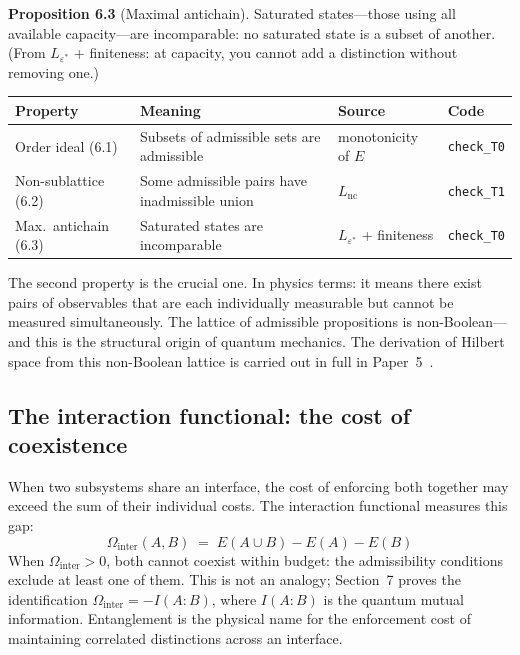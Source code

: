\documentclass[11pt]{article}
\begin{document}
\textbf{Proposition 6.3} (Maximal antichain).  Saturated states---those using all available capacity---are incomparable: no saturated state is a subset of another.  (From $L_{\varepsilon^*}$ + finiteness: at capacity, you cannot add a distinction without removing one.)

\smallskip
\begin{center}
\small
\begin{tabular}{lp{4.2cm}ll}
\toprule
\textbf{Property} & \textbf{Meaning} & \textbf{Source} & \textbf{Code} \\
\midrule
Order ideal (6.1) & Subsets of admissible sets are admissible & monotonicity of $E$ & \texttt{check\_T0} \\
Non-sublattice (6.2) & Some admissible pairs have inadmissible union & $L_{\mathrm{nc}}$ & \texttt{check\_T1} \\
Max.\ antichain (6.3) & Saturated states are incomparable & $L_{\varepsilon^*}$ + finiteness & \texttt{check\_T0} \\
\bottomrule
\end{tabular}
\end{center}
\smallskip

The second property is the crucial one.  In physics terms: it means there exist pairs of observables that are each individually measurable but cannot be measured simultaneously.  The lattice of admissible propositions is non-Boolean---and this is the structural origin of quantum mechanics.  The derivation of Hilbert space from this non-Boolean lattice is carried out in full in Paper~5~\cite{P5}.


\subsection{The interaction functional: the cost of coexistence}

When two subsystems share an interface, the cost of enforcing both together may exceed the sum of their individual costs.  The interaction functional measures this gap:
\begin{equation}
\Omega_{\mathrm{inter}}(A,B) \;=\; E(A \cup B) - E(A) - E(B)
\end{equation}
When $\Omega_{\mathrm{inter}} > 0$, both cannot coexist within budget: the admissibility conditions exclude at least one of them.  This is not an analogy; Section~7 proves the identification $\Omega_{\mathrm{inter}} = -I(A{:}B)$, where $I(A{:}B)$ is the quantum mutual information.  Entanglement is the physical name for the enforcement cost of maintaining correlated distinctions across an interface.
\end{document}
